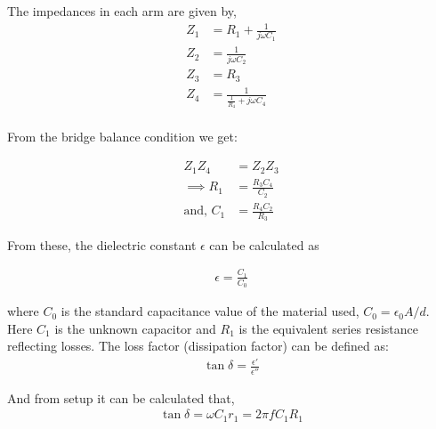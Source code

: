 The impedances in each arm are given by,
\begin{align*}
	Z_1 &= R_1 + \frac{1}{j\omega C_1}\\
	Z_2 &=  \frac{1}{j\omega C_2}\\
	Z_3 &= R_3\\
	Z_4 &= \frac{1}{\frac{1}{R_4} + j\omega C_4}\\
\end{align*}

From the bridge balance condition we get:

\begin{align}
	Z_1Z_4 &= Z_2Z_3 \nonumber\\
	\implies R_1&=\frac{R_3 C_4}{C_2}\\
	\text{and, }C_1&=\frac{R_4 C_2}{R_3}
\end{align}

From these, the dielectric constant $\epsilon$ can be calculated as

\begin{align}
	\epsilon = \frac{C_1}{C_0}
\end{align}

where $C_0$ is the standard capacitance value of the material used, $C_0 = \epsilon_0 A/d$. Here $C_1$ is the unknown capacitor and $R_1$ is the equivalent series resistance reflecting losses. The loss factor (dissipation factor) can be defined as:
\begin{align}
	\tan\delta=\frac{\epsilon'}{\epsilon''}
\end{align}

And from setup it can be calculated that,
\begin{align}
	\tan\delta=\omega C_1r_1 = 2\pi fC_1R_1
\end{align}